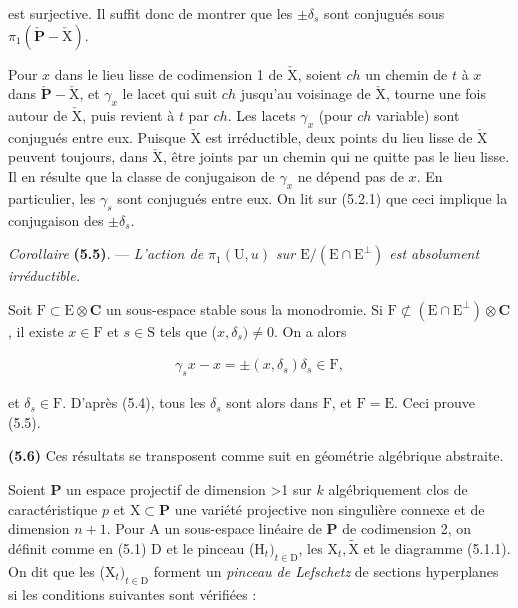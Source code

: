\documentclass[10pt,leqno]{article}
\begin{document}
\noindent est surjective. Il suffit donc de montrer que les \(\pm \delta _{s}\) sont conjugués sous \(\pi _{1}(\check{\mathbf{P}}- \check{\mathrm{X}})\).\par

\noindent Pour \(x\) dans le lieu lisse de codimension 1 de \(\check{\mathrm{X}}\), soient \(ch\) un chemin de \(t\) à \(x\) dans \(\check{\mathbf{P}}- \check{\mathrm{X}}\), et \(\gamma _{x}\) le lacet qui suit \(ch\) jusqu’au voisinage de \(\check{\mathrm{X}}\), tourne une fois autour de \(\check{\mathrm{X}}\), puis revient à \(t\) par \(ch\). Les lacets \(\gamma _{x}\) (pour \(ch\) variable) sont conjugués entre eux. Puisque \(\check{\mathrm{X}}\) est irréductible, deux points du lieu lisse de \(\check{\mathrm{X}}\) peuvent toujours, dans \(\check{\mathrm{X}}\), être joints par un chemin qui ne quitte pas le lieu lisse. Il en résulte que la classe de conjugaison de \(\gamma _{x}\) ne dépend pas de \(x\). En particulier, les \(\gamma _{s}\) sont conjugués entre eux. On lit sur (5.2.1) que ceci implique la conjugaison des \(\pm \delta _{s}\).\par

\noindent \emph{Corollaire} \textbf{(5.5)}. — {\itshape L’action de \(\pi _{1}(\mathrm{U},u)\) sur \(\mathrm{E}/(\mathrm{E}\cap \mathrm{E}^{\perp })\) est absolument irréductible.}\par

\noindent Soit \(\mathrm{F}\subset \mathrm{E}\otimes \mathbf{C}\) un sous-espace stable sous la monodromie. Si \(\mathrm{F}\not\subset (\mathrm{E}\cap \mathrm{E}^{\perp })\otimes \mathbf{C}\), il existe \(x\in \mathrm{F}\) et \(s\in \mathrm{S}\) tels que (\(x,\delta _{s})\ne 0\). On a alors\par

\begin{equation*}\begin{gathered}\gamma _{s} x- x = \pm (x,\delta _{s})\delta _{s} \in  \mathrm{F},\end{gathered}\end{equation*}

\noindent et \(\delta _{s}\in \mathrm{F}\). D’après (5.4), tous les \(\delta _{s}\) sont alors dans \(\mathrm{F}\), et \(\mathrm{F}=\mathrm{E}\). Ceci prouve (5.5).\par

\noindent \textbf{(5.6)} Ces résultats se transposent comme suit en géométrie algébrique abstraite.\par

\noindent Soient \(\mathbf{P}\) un espace projectif de dimension >1 sur \(k\) algébriquement clos de caractéristique \(p\) et \(\mathrm{X}\subset \mathbf{P}\) une variété projective non singulière connexe et de dimension \(n+1\). Pour \(\mathrm{A}\) un sous-espace linéaire de \(\mathbf{P}\) de codimension 2, on définit comme en (5.1) D et le pinceau (\(\mathrm{H}_{t})_{t\in \mathrm{D}}\), les \(\mathrm{X}_{t}, \widetilde{\mathrm{X}}\) et le diagramme (5.1.1). On dit que les (\(\mathrm{X}_{t})_{t\in \mathrm{D}}\) forment un \emph{pinceau de Lefschetz} de sections hyperplanes si les conditions suivantes sont vérifiées :\par
\end{document}
